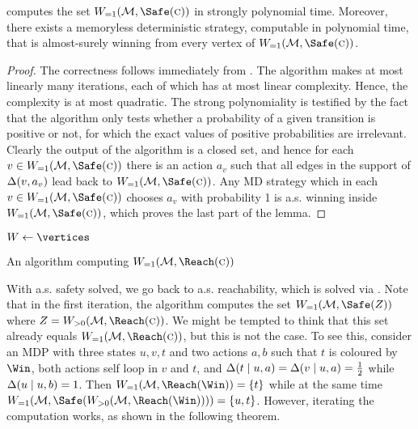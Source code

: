 \begin{theorem}
\label{5-thm:safety-main}
 computes the set $\winAS(\mdp,\Safe(\genColour))$ in strongly polynomial time. Moreover, there exists a memoryless deterministic strategy, computable in polynomial time, that is almost-surely winning from every vertex of $\winAS(\mdp,\Safe(\genColour))$.
\end{theorem}
\begin{proof}
The correctness follows immediately from . The algorithm makes at most linearly many iterations, each of which has at most linear complexity. Hence, the complexity is at most quadratic. The strong polynomiality is testified by the fact that the algorithm only tests whether a 
probability of a given transition is positive or not, for which the exact 
values of positive probabilities are irrelevant. Clearly the output of the algorithm is a closed set, and hence for each $ v\in  \winAS(\mdp,\Safe(\genColour))$ there is an action $ a_v $ such that all edges in the support of $ \Delta(v,a_v)  $ lead back to $ \winAS(\mdp,\Safe(\genColour)) $. Any MD strategy which in each $ v\in  \winAS(\mdp,\Safe(\genColour)) $ chooses $ a_v $ with probability 1 is a.s. winning inside $ \winAS(\mdp,\Safe(\genColour)) $, which proves the last part of the lemma.
\end{proof}




\begin{algorithm}
$W \leftarrow \vertices$ \;	

 
\caption{An algorithm computing $\winAS(\mdp,\Reach(\genColour))$}
\label{5-algo:reach-as}
\end{algorithm}

With a.s. safety solved, we go back to a.s. reachability, which is solved via . Note that in the first iteration, the algorithm computes the set %
$\winAS(\mdp,\Safe(Z))$ where $ Z =  \winPos(\mdp,\Reach(\genColour))$. We might be tempted to think that this set already equals $ \winAS(\mdp,\Reach(\genColour)) $, but this is not the case. To see this, consider an MDP with three states $ u,v,t $ and two actions $ a,b $ such that $ t $ is coloured by $ \Win $, both actions self loop in $ v $ and $ t $, and $ \Delta(t \mid u,a) = \Delta(v \mid u,a) = \frac{1}{2} $ while $ \Delta(u \mid u,b) = 1 $. Then $ \winAS(\mdp,\Reach(\Win)) = \{t\} $ while at the same time $ \winAS(\mdp,\Safe( \winPos(\mdp,\Reach(\Win)))) = \{u,t\}$. However, iterating the computation works, as shown in the following theorem.

